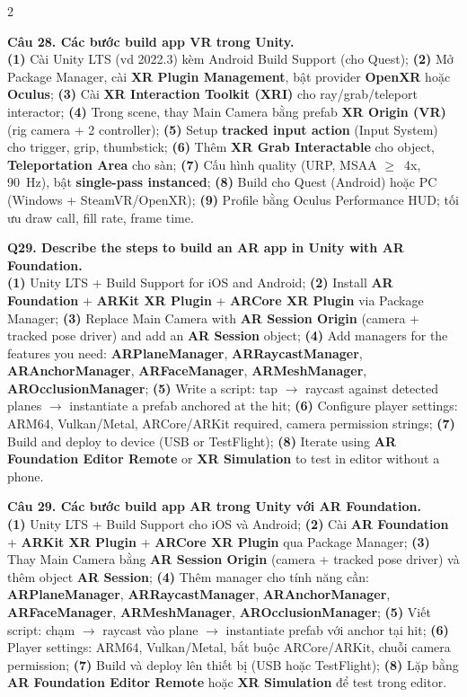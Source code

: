 \begin{paracol}{2}
\switchcolumn

\textbf{Câu 28. Các bước build app VR trong Unity.}\\
\textbf{(1)} Cài Unity LTS (vd 2022.3) kèm Android Build Support (cho Quest); \textbf{(2)} Mở Package Manager, cài \textbf{XR Plugin Management}, bật provider \textbf{OpenXR} hoặc \textbf{Oculus}; \textbf{(3)} Cài \textbf{XR Interaction Toolkit (XRI)} cho ray/grab/teleport interactor; \textbf{(4)} Trong scene, thay Main Camera bằng prefab \textbf{XR Origin (VR)} (rig camera + 2 controller); \textbf{(5)} Setup \textbf{tracked input action} (Input System) cho trigger, grip, thumbstick; \textbf{(6)} Thêm \textbf{XR Grab Interactable} cho object, \textbf{Teleportation Area} cho sàn; \textbf{(7)} Cấu hình quality (URP, MSAA $\geq$~4x, 90~Hz), bật \textbf{single-pass instanced}; \textbf{(8)} Build cho Quest (Android) hoặc PC (Windows + SteamVR/OpenXR); \textbf{(9)} Profile bằng Oculus Performance HUD; tối ưu draw call, fill rate, frame time.

\switchcolumn*

\textbf{Q29. Describe the steps to build an AR app in Unity with AR Foundation.}\\
\textbf{(1)} Unity LTS + Build Support for iOS and Android; \textbf{(2)} Install \textbf{AR Foundation} + \textbf{ARKit XR Plugin} + \textbf{ARCore XR Plugin} via Package Manager; \textbf{(3)} Replace Main Camera with \textbf{AR Session Origin} (camera + tracked pose driver) and add an \textbf{AR Session} object; \textbf{(4)} Add managers for the features you need: \textbf{ARPlaneManager}, \textbf{ARRaycastManager}, \textbf{ARAnchorManager}, \textbf{ARFaceManager}, \textbf{ARMeshManager}, \textbf{AROcclusionManager}; \textbf{(5)} Write a script: tap $\to$ raycast against detected planes $\to$ instantiate a prefab anchored at the hit; \textbf{(6)} Configure player settings: ARM64, Vulkan/Metal, ARCore/ARKit required, camera permission strings; \textbf{(7)} Build and deploy to device (USB or TestFlight); \textbf{(8)} Iterate using \textbf{AR Foundation Editor Remote} or \textbf{XR Simulation} to test in editor without a phone.

\switchcolumn

\textbf{Câu 29. Các bước build app AR trong Unity với AR Foundation.}\\
\textbf{(1)} Unity LTS + Build Support cho iOS và Android; \textbf{(2)} Cài \textbf{AR Foundation} + \textbf{ARKit XR Plugin} + \textbf{ARCore XR Plugin} qua Package Manager; \textbf{(3)} Thay Main Camera bằng \textbf{AR Session Origin} (camera + tracked pose driver) và thêm object \textbf{AR Session}; \textbf{(4)} Thêm manager cho tính năng cần: \textbf{ARPlaneManager}, \textbf{ARRaycastManager}, \textbf{ARAnchorManager}, \textbf{ARFaceManager}, \textbf{ARMeshManager}, \textbf{AROcclusionManager}; \textbf{(5)} Viết script: chạm $\to$ raycast vào plane $\to$ instantiate prefab với anchor tại hit; \textbf{(6)} Player settings: ARM64, Vulkan/Metal, bắt buộc ARCore/ARKit, chuỗi camera permission; \textbf{(7)} Build và deploy lên thiết bị (USB hoặc TestFlight); \textbf{(8)} Lặp bằng \textbf{AR Foundation Editor Remote} hoặc \textbf{XR Simulation} để test trong editor.


\end{paracol}
